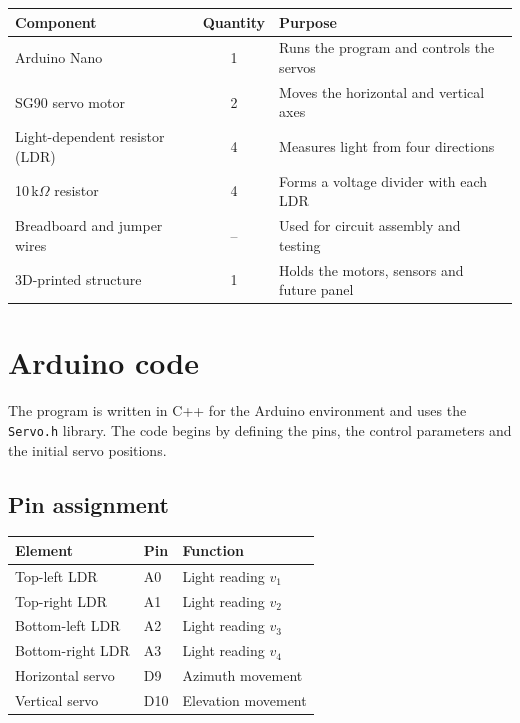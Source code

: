 \documentclass[10pt,a4paper]{article}
\begin{document}
\begin{center}
\small
\begin{tabularx}{\linewidth}{@{}l c Y@{}}
\toprule
\textbf{Component} & \textbf{Quantity} & \textbf{Purpose} \\
\midrule
Arduino Nano & 1 & Runs the program and controls the servos \\
SG90 servo motor & 2 & Moves the horizontal and vertical axes \\
Light-dependent resistor (LDR) & 4 & Measures light from four directions \\
10\,k$\Omega$ resistor & 4 & Forms a voltage divider with each LDR \\
Breadboard and jumper wires & -- & Used for circuit assembly and testing \\
3D-printed structure & 1 & Holds the motors, sensors and future panel \\
\bottomrule
\end{tabularx}
\end{center}

\section{Arduino code}

The program is written in C++ for the Arduino environment and uses the \texttt{Servo.h} library. The code begins by defining the pins, the control parameters and the initial servo positions.

\subsection{Pin assignment}

\begin{center}
\small
\begin{tabularx}{\linewidth}{@{}l l Y@{}}
\toprule
\textbf{Element} & \textbf{Pin} & \textbf{Function} \\
\midrule
Top-left LDR & A0 & Light reading $v_1$ \\
Top-right LDR & A1 & Light reading $v_2$ \\
Bottom-left LDR & A2 & Light reading $v_3$ \\
Bottom-right LDR & A3 & Light reading $v_4$ \\
Horizontal servo & D9 & Azimuth movement \\
Vertical servo & D10 & Elevation movement \\
\bottomrule
\end{tabularx}
\end{center}
\end{document}
